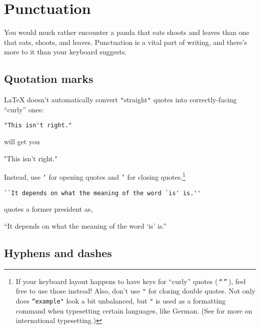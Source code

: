 \chapter{Punctuation}
\label{punctuation}

You would much rather encounter a panda that eats
shoots and leaves than one that eats, shoots,
and leaves.\punckern{}
Punctuation is a vital part of writing,
and there's more to it than your keyboard suggests.

\section{Quotation marks}

\LaTeX{} doesn't automatically convert \texttt{"}straight\texttt{"} quotes
into correctly-facing ``curly'' ones:
\begin{leftfigure}
\begin{lstlisting}
"This isn't right."
\end{lstlisting}
\end{leftfigure}
will get you
\begin{leftfigure}
\lm%
"This isn't right."
\end{leftfigure}
Instead, use \texttt{`} for opening quotes and \texttt{'} for closing
quotes.\punckern\footnote{If your keyboard layout happens to have keys for
``curly'' quotes (\,\texttt{“}\,\texttt{”}\,), feel free to use those instead!
Also, don't use \texttt{"} for closing double quotes.
Not only does \texttt{``example"} look a bit unbalanced,
but \texttt{"} is used as a formatting command when typesetting certain
languages, like German. (See  for more on international
typesetting.)}
\begin{leftfigure}
\begin{lstlisting}
``It depends on what the meaning of the word `is' is.''
\end{lstlisting}
\end{leftfigure}
quotes a former  president as,
\begin{leftfigure}
\lm%
``It depends on what the meaning of the word `is' is.''
\end{leftfigure}

\section{Hyphens and dashes}

